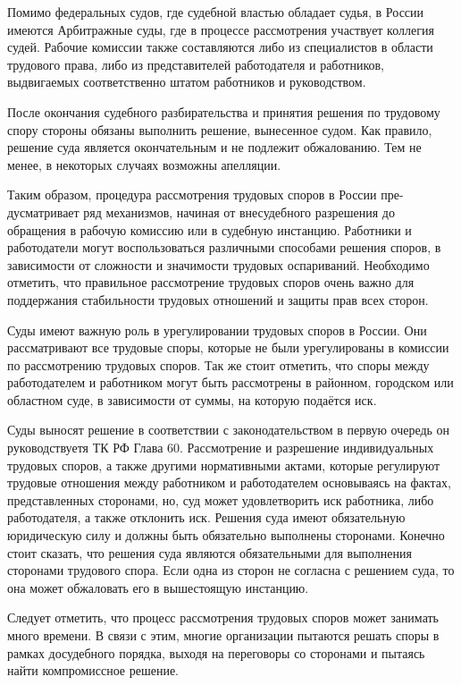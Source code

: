 Помимо федеральных судов, где судебной властью обладает судья, в России имеются Арбитражные суды, где в процессе рассмотрения участвует коллегия судей. Рабочие комиссии также составляются либо из специалистов в области трудового права, либо из представителей работодателя и работников, выдвигаемых соответственно штатом работников и руководством.

После окончания судебного разбирательства и принятия решения по трудовому спору стороны обязаны выполнить решение, вынесенное судом. Как правило, решение суда является окончательным и не подлежит обжалованию. Тем не менее, в некоторых случаях возможны апелляции.

Таким образом, процедура рассмотрения трудовых споров в России пре-дусматривает ряд механизмов, начиная от внесудебного разрешения до обращения в рабочую комиссию или в судебную инстанцию. Работники и работодатели могут воспользоваться различными способами решения споров, в зависимости от сложности и значимости трудовых оспариваний. Необходимо отметить, что правильное рассмотрение трудовых споров очень важно для поддержания стабильности трудовых отношений и защиты прав всех сторон.

Суды имеют важную роль в урегулировании трудовых споров в России. Они рассматривают все трудовые споры, которые не были урегулированы в комиссии по рассмотрению трудовых споров. Так же стоит отметить, что споры между работодателем и работником могут быть рассмотрены в районном, городском или областном суде, в зависимости от суммы, на которую подаётся иск.

Суды выносят решение в соответствии с законодательством в первую очередь он руководствуетя ТК РФ Глава 60. Рассмотрение и разрешение индивидуальных трудовых споров, а также другими нормативными актами, которые регулируют трудовые отношения между работником и работодателем основываясь на фактах, представленных сторонами, но, суд может удовлетворить иск работника, либо работодателя, а также отклонить иск. Решения суда имеют обязательную юридическую силу и должны быть обязательно выполнены сторонами. Конечно стоит сказать, что решения суда являются обязательными для выполнения сторонами трудового спора. Если одна из сторон не согласна с решением суда, то она может обжаловать его в вышестоящую инстанцию.

Следует отметить, что процесс рассмотрения трудовых споров может занимать много времени. В связи с этим, многие организации пытаются решать споры в рамках досудебного порядка, выходя на переговоры со сторонами и пытаясь найти компромиссное решение.

